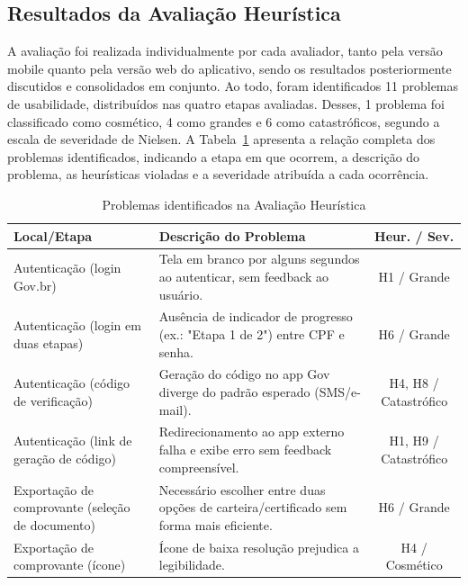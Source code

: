 \documentclass[12pt]{article}
\begin{document}
\begin{abstractp}
 \subsection{Resultados da Avaliação Heurística} \label{sec:resultados_heuristica}

A avaliação foi realizada individualmente por cada avaliador, tanto pela versão mobile quanto pela versão web do aplicativo, sendo os resultados posteriormente discutidos e consolidados em conjunto. Ao todo, foram identificados 11 problemas de usabilidade, distribuídos nas quatro etapas avaliadas. Desses, 1 problema foi classificado como cosmético, 4 como grandes e 6 como catastróficos, segundo a escala de severidade de Nielsen. A Tabela~\ref{tab:heuristica} apresenta a relação completa dos problemas identificados, indicando a etapa em que ocorrem, a descrição do problema, as heurísticas violadas e a severidade atribuída a cada ocorrência.


\begin{table}[htbp]
\centering
\footnotesize
\renewcommand{\arraystretch}{0.95}
\caption{Problemas identificados na Avaliação Heurística}
\label{tab:heuristica}
\begin{tabular}{|p{3.5cm}|p{7.5cm}|c|}
\hline
\textbf{Local/Etapa} & \textbf{Descrição do Problema} & \textbf{Heur.} / \textbf{Sev.} \\
\hline

Autenticação (login Gov.br) & 
Tela em branco por alguns segundos ao autenticar, sem feedback ao usuário. & 
H1 / Grande \\
\hline

Autenticação (login em duas etapas) & 
Ausência de indicador de progresso (ex.: "Etapa 1 de 2") entre CPF e senha. & 
H6 / Grande \\
\hline

Autenticação (código de verificação) & 
Geração do código no app Gov diverge do padrão esperado (SMS/e-mail). & 
H4, H8 / Catastrófico \\
\hline

Autenticação (link de geração de código) & 
Redirecionamento ao app externo falha e exibe erro sem feedback compreensível. & 
H1, H9 / Catastrófico \\
\hline

Exportação de comprovante (seleção de documento) & 
Necessário escolher entre duas opções de carteira/certificado sem forma mais eficiente. & 
H6 / Grande \\
\hline

Exportação de comprovante (ícone) & 
Ícone de baixa resolução prejudica a legibilidade. & 
H4 / Cosmético \\
\hline


\end{tabular}
\end{table}
\end{abstractp}
\end{document}
